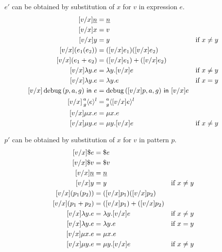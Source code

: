  \(e'\) can be obtained by substitution of \(x\) for
\(v\) in expression \(e\).
\[
  \begin{aligned}
    [v / x] \Nat{n} &= \Nat{n} \\
    [v / x] x &= v \\
    [v / x] y &= y && \text{if } x \neq y \\
    [v / x] (e_1(e_2)) &= ([v / x] e_1)([v / x] e_2) \\
    [v / x] (e_1 + e_2) &= ([v / x] e_1) + ([v / x] e_2) \\
    [v / x] \Lam{y}{e} &= \Lam{y}{[v / x] e} && \text{if } x \neq y \\
    [v / x] \Lam{y}{e} &= \Lam{y}{e} && \text{if } x = y \\
    [v / x] \Filter{(p, a, g)}{e} &= \Filter{([v / x]p, a, g)}{[v / x] e} \\
    [v / x] \Residue{a}{g}{l}{e} &= \Residue{a}{g}{l}{[v / x] e} \\
    [v / x] \Fix{x}{e} &= \Fix{x}{e} \\
    [v / x] \Fix{y}{e} &= \Fix{y}{[v / x]e} && \text{if } x \neq y
  \end{aligned}
\]

 \(p'\) can be obtained by substitution of \(x\) for
\(v\) in pattern \(p\).
\[
  \begin{aligned}
    [v / x] \$e &= \$e \\
    [v / x] \$v &= \$v \\
    [v / x] \Nat{n} &= \Nat{n} \\
    [v / x] y &= y && \text{if } x \neq y \\
    [v / x] (p_1(p_2)) &= ([v / x] p_1)([v / x] p_2) \\
    [v / x] (p_1 + p_2) &= ([v / x] p_1) + ([v / x] p_2) \\
    [v / x] \Lam{y}{e} &= \Lam{y}{[v / x] e} && \text{if } x \neq y \\
    [v / x] \Lam{y}{e} &= \Lam{y}{e} && \text{if } x = y \\
    [v / x] \Fix{x}{e} &= \Fix{x}{e} \\
    [v / x] \Fix{y}{e} &= \Fix{y}{[v / x]e} && \text{if } x \neq y
  \end{aligned}
\]

